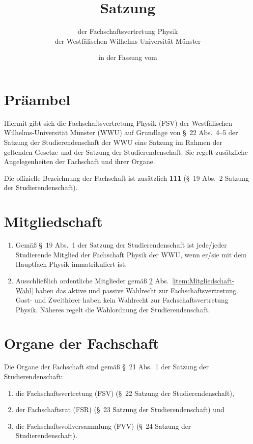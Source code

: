 \documentclass[
	a4paper,
	12pt,
	oneside,
	parskip=half-,
	pagesize,
	headsepline,
	german,
	ngerman
]{scrartcl}
\title{Satzung}
\subtitle{der Fachschaftsvertretung Physik\\
der Westfälischen Wilhelms-Universität Münster}
\date{in der Fassung vom \formatdate{17}{12}{2014}}
\author{}
\begin{document}
\maketitle

\section{Präambel}
Hiermit gibt sich die Fachschaftsvertretung Physik (FSV) der Westfälischen Wilhelms-Universi\-tät Münster (WWU) auf Grundlage von §~22 Abs.~4--5 der Satzung der Studierendenschaft der WWU eine Satzung im Rahmen der geltenden Gesetze und der Satzung der Studierendenschaft. Sie regelt zusätzliche Angelegenheiten der Fachschaft und ihrer Organe.

Die offizielle Bezeichnung der Fachschaft ist zusätzlich \textbf{111} (§~19 Abs.~2 Satzung der Studierendenschaft).

\section{Mitgliedschaft}
\label{sec:Mitgliedschaft}
\begin{enumerate}
	\item Gemäß §~19 Abs.~1 der Satzung der Studierendenschaft ist jede/jeder Studierende Mitglied der Fachschaft Physik der WWU, wenn er/sie mit dem Hauptfach Physik immatrikuliert ist. \label{item:Mitgliedschaft-Wahl}
	\item Ausschließlich ordentliche Mitglieder gemäß \ref{sec:Mitgliedschaft} Abs.~\ref{item:Mitgliedschaft-Wahl} haben das aktive und passive Wahlrecht zur Fachschaftsvertretung. Gast- und Zweithörer haben kein Wahlrecht zur Fachschaftsvertretung Physik. Näheres regelt die Wahlordnung der Studierendenschaft.
\end{enumerate}

\section{Organe der Fachschaft}
Die Organe der Fachschaft sind gemäß §~21 Abs.~1 der Satzung der Studierendenschaft:
\begin{enumerate}
	\item die Fachschaftsvertretung (FSV) (§~22 Satzung der Studierendenschaft),
	\item der Fachschaftsrat (FSR) (§~23 Satzung der Studierendenschaft) und 
	\item die Fachschaftsvollversammlung (FVV) (§~24 Satzung der Studierendenschaft).
\end{enumerate}
\end{document}
